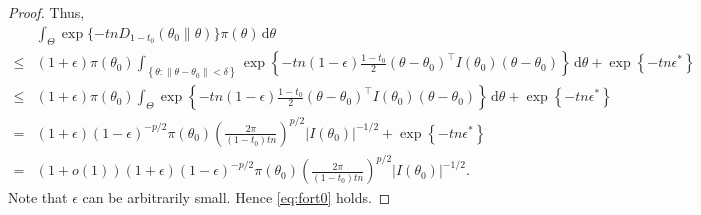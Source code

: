 \documentclass[11pt]{article}
\theoremstyle{plain}
\theoremstyle{definition}
\theoremstyle{remark}
\begin{document}
\begin{appendices}
\begin{proof}
Thus,
\begin{align*}
        &\int_{ \Theta } \exp\{-tn D_{1-t_0}(\theta_0 \| \theta)\} \pi (\theta) \, \mathrm d \theta
        \\
        \leq &
        (1+\epsilon) \pi(\theta_0)
        \int_{ \left\{ \theta: \|\theta - \theta_0\| < \delta \right\}}
        \exp\left\{ 
            -tn
        (1-\epsilon) \frac{1-t_0}{2} (\theta -\theta_0)^\top I(\theta_0) (\theta - \theta_0)
        \right\}
        \, \mathrm d \theta
        +
        \exp\left\{ -tn \epsilon^* \right\}
        \\
        \leq &
        (1+\epsilon) \pi(\theta_0)
        \int_{\Theta}
        \exp\left\{ 
            -tn
        (1-\epsilon) \frac{1-t_0}{2} (\theta -\theta_0)^\top I(\theta_0) (\theta - \theta_0)
        \right\}
        \, \mathrm d \theta
        +
        \exp\left\{ -tn \epsilon^* \right\}
        \\
        = &
        (1+\epsilon) (1-\epsilon)^{-p/2}  \pi(\theta_0) \left( \frac{2\pi}{(1-t_0) tn } \right)^{p/2} |I(\theta_0)|^{-1/2}
        +
        \exp\left\{ -tn \epsilon^* \right\}
        \\
        = &
        (1+o(1))
        (1+\epsilon) (1-\epsilon)^{-p/2}  \pi(\theta_0) \left( \frac{2\pi}{(1-t_0) tn } \right)^{p/2} |I(\theta_0)|^{-1/2}
        .
\end{align*}
Note that $\epsilon$ can be arbitrarily small. 
Hence \eqref{eq:fort0} holds.
    
\end{proof}








\end{appendices}
\end{document}
